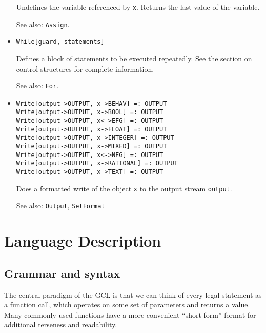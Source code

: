 \begin{itemize}
\bd
Undefines the variable referenced by \verb+x+.  Returns the
last value of the variable.
\item
[See also:] {\tt Assign}.
\ed



\item 
\protect \large \begin{verbatim}
While[guard, statements]
\end{verbatim} \normalsize
  
\bd
Defines a block of statements to be executed repeatedly.
See the section on control structures for complete information.
\item
[See also:] \verb+For+.
\ed

\item
\protect \large \begin{verbatim}
Write[output->OUTPUT, x->BEHAV] =: OUTPUT 
Write[output->OUTPUT, x->BOOL] =: OUTPUT 
Write[output->OUTPUT, x<->EFG] =: OUTPUT
Write[output->OUTPUT, x->FLOAT] =: OUTPUT
Write[output->OUTPUT, x->INTEGER] =: OUTPUT
Write[output->OUTPUT, x->MIXED] =: OUTPUT
Write[output->OUTPUT, x<->NFG] =: OUTPUT
Write[output->OUTPUT, x->RATIONAL] =: OUTPUT
Write[output->OUTPUT, x->TEXT] =: OUTPUT
\end{verbatim}\normalsize

\bd
Does a formatted write of the object \verb+x+ to the
output stream \verb+output+.  
\item
[See also:] {\tt Output}, {\tt SetFormat}
\ed




\end{itemize}






\section{Language Description}

\subsection{Grammar and syntax}

The central paradigm of the GCL is that we can think of every legal
statement as a function call, which operates on some set of parameters and
returns a value.  Many commonly used functions have a more convenient
``short form'' format for additional terseness and readability.

